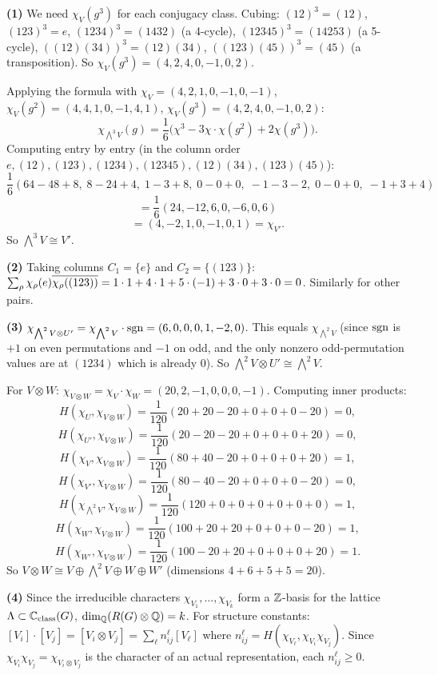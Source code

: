 \documentclass{report}
\begin{document}
\begin{solution}
\textbf{(1)} We need \(\chi_V(g^3)\) for each conjugacy class. Cubing: \((12)^3 = (12)\), \((123)^3 = e\), \((1234)^3 = (1432)\) (a 4-cycle), \((12345)^3 = (14253)\) (a 5-cycle), \(((12)(34))^3 = (12)(34)\), \(((123)(45))^3 = (45)\) (a transposition). So \(\chi_V(g^3) = (4, 2, 4, 0, -1, 0, 2)\).

Applying the formula with \(\chi_V = (4, 2, 1, 0, -1, 0, -1)\), \(\chi_V(g^2) = (4, 4, 1, 0, -1, 4, 1)\), \(\chi_V(g^3) = (4, 2, 4, 0, -1, 0, 2)\):
\[\chi_{\bigwedge^3 V}(g) = \frac{1}{6}\bigl(\chi^3 - 3\chi \cdot \chi(g^2) + 2\chi(g^3)\bigr).\]
Computing entry by entry (in the column order \(e, (12), (123), (1234), (12345), (12)(34), (123)(45)\)):
\[\frac{1}{6}(64-48+8,\; 8-24+4,\; 1-3+8,\; 0-0+0,\; -1-3-2,\; 0-0+0,\; -1+3+4)\] 
\[ = \frac{1}{6}(24, -12, 6, 0, -6, 0, 6)\]
\[= (4, -2, 1, 0, -1, 0, 1) = \chi_{V'}.\]
So \(\bigwedge^3 V \cong V'\).

\textbf{(2)} Taking columns \(C_1 = \{e\}\) and \(C_2 = \{(123)\}\): \(\sum_\rho \chi_\rho(e)\overline{\chi_\rho((123))} = 1 \cdot 1 + 4 \cdot 1 + 5 \cdot (-1) + 3 \cdot 0 + 3 \cdot 0 = 0\). Similarly for other pairs.

\textbf{(3)} \(\chi_{\bigwedge^2 V \otimes U'} = \chi_{\bigwedge^2 V} \cdot \operatorname{sgn} = (6, 0, 0, 0, 1, -2, 0)\). This equals \(\chi_{\bigwedge^2 V}\) (since \(\operatorname{sgn}\) is \(+1\) on even permutations and \(-1\) on odd, and the only nonzero odd-permutation values are at \((1234)\) which is already 0). So \(\bigwedge^2 V \otimes U' \cong \bigwedge^2 V\).

For \(V \otimes W\): \(\chi_{V \otimes W} = \chi_V \cdot \chi_W = (20, 2, -1, 0, 0, 0, -1)\). Computing inner products:
\[H(\chi_U, \chi_{V \otimes W}) = \frac{1}{120}(20+20-20+0+0+0-20) = 0,\]
\[H(\chi_{U'}, \chi_{V \otimes W}) = \frac{1}{120}(20-20-20+0+0+0+20) = 0,\]
\[H(\chi_V, \chi_{V \otimes W}) = \frac{1}{120}(80+40-20+0+0+0+20) = 1,\]
\[H(\chi_{V'}, \chi_{V \otimes W}) = \frac{1}{120}(80-40-20+0+0+0-20) = 0,\]
\[H(\chi_{\bigwedge^2 V}, \chi_{V \otimes W}) = \frac{1}{120}(120+0+0+0+0+0+0) = 1,\]
\[H(\chi_W, \chi_{V \otimes W}) = \frac{1}{120}(100+20+20+0+0+0-20) = 1,\]
\[H(\chi_{W'}, \chi_{V \otimes W}) = \frac{1}{120}(100-20+20+0+0+0+20) = 1.\]
So \(V \otimes W \cong V \oplus \bigwedge^2 V \oplus W \oplus W'\) (dimensions \(4 + 6 + 5 + 5 = 20\)).

\textbf{(4)} Since the irreducible characters \(\chi_{V_1}, \ldots, \chi_{V_k}\) form a \({\ZZ}\)-basis for the lattice \(\Lambda \subset {\CC}_{\mathrm{class}}(G)\), \(\dim_{\QQ} (R(G) \otimes {\QQ}) = k\). For structure constants: \([V_i] \cdot [V_j] = [V_i \otimes V_j] = \sum_\ell n_{ij}^\ell [V_\ell]\) where \(n_{ij}^\ell = H(\chi_{V_\ell}, \chi_{V_i} \chi_{V_j})\). Since \(\chi_{V_i} \chi_{V_j} = \chi_{V_i \otimes V_j}\) is the character of an actual representation, each \(n_{ij}^\ell \geq 0\).


\end{solution}
\end{document}
